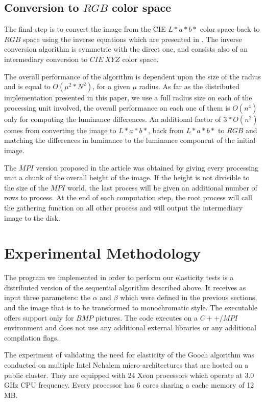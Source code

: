 \documentclass[conference]{IEEEtran}
\begin{document}
\subsection{Conversion to $\mathit{RGB}$ color space}
The final step is to convert the image from the CIE $\mathit{L*a*b*}$ color space back to $\mathit{RGB}$ space using the inverse equations which are presented in \cite{ford1998colour}. The inverse conversion algorithm is symmetric with the direct one, and consists also of an intermediary conversion to $\mathit{CIE\ XYZ}$ color space.

The overall performance of the algorithm is dependent upon the size of the radius and is equal to $\mathit{O(\mu^2*N^2)}$, for a given ${\mu}$ radius. As far as the distributed implementation presented in this paper, we use a full radius size on each of the processing unit involved, the overall performance on each one of them is $\mathit{O(n^4)}$ only for computing the luminance differences. An additional factor of $\mathit{3*O(n^2)}$ comes from converting the image to $\mathit{L*a*b*}$, back from $\mathit{L*a*b*}$ to $\mathit{RGB}$ and matching the differences in luminance to the luminance component of the initial image.

The $\mathit{MPI}$ version proposed in the article was obtained by giving every processing unit a chunk of the overall height of the image. If the height is not divisible to the size of the $\mathit{MPI}$ world, the last process will be given an additional number of rows to process. At the end of each computation step, the root process will call the gathering function on all other process and will output the intermediary image to the disk.

\section{Experimental Methodology}
The program we implemented in order to perform our elasticity tests is a distributed version of the sequential algorithm described above. It receives as input three parameters: the $\mathit{\alpha}$ and $\mathit{\beta}$ which were defined in the previous sections, and the image that is to be transformed to monochromatic style. The executable offers support only for $\mathit{BMP}$ pictures. The code executes on a $\mathit{C++/MPI}$ environment  and does not use any additional external libraries or any additional compilation flags.

The experiment of validating the need for elasticity of the Gooch algorithm was conducted on multiple Intel Nehalem micro-architectures that are hosted on a public cluster. They are equipped with 24 Xeon processors which operate at 3.0 GHz CPU frequency. Every processor has 6 cores sharing a cache memory of 12 MB. 
\end{document}
